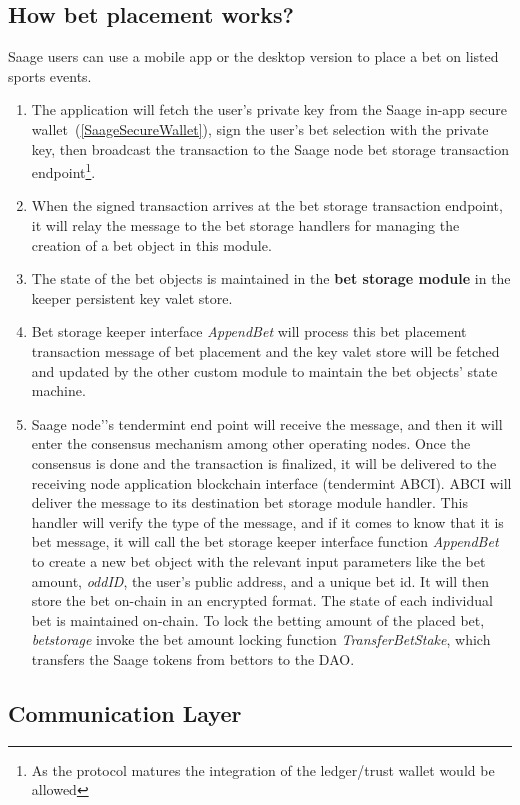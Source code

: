 \documentclass[%
 reprint,
 amsmath,amssymb,
 aps,
]{revtex4-2}
\begin{document}
\subsection{How bet placement works?}
Saage users can use a mobile app or the desktop version to place a bet on listed sports events. 
\begin{enumerate}
\item The application will fetch the user's private key from the Saage in-app secure wallet~(\ref{SaageSecureWallet}), sign the user's bet selection with the private key, then broadcast the transaction to the Saage node bet storage transaction endpoint\footnote{As the protocol matures the integration of the ledger/trust wallet would be allowed}.
\item When the signed transaction arrives at the bet storage transaction endpoint, it will relay the message to the bet storage handlers for managing the creation of a bet object in this module. 
\item The state of the bet objects is maintained in the \textbf{bet storage module} in the keeper persistent key valet store. 
\item Bet storage keeper interface \textit{AppendBet} will process this bet placement transaction message of bet placement and the key valet store will be fetched and updated by the other custom module to maintain the bet objects’ state machine. 
\item Saage node'’s tendermint end point will receive the message, and then it will enter the consensus mechanism among other operating nodes. Once the consensus is done and the transaction is finalized, it will be delivered to the receiving node application blockchain interface (tendermint ABCI). ABCI will deliver the message to its destination bet storage module handler. This handler will verify the type of the message, and if it comes to know that it is bet message, it will call the bet storage keeper interface function \textit{AppendBet} to create a new bet object with the relevant input parameters like the bet amount, \textit{oddID}, the user’s public address, and a unique bet id. It will then store the bet on-chain in an encrypted format. The state of each individual bet is maintained on-chain. To lock the betting amount of the placed bet, \textit{betstorage} invoke the bet amount locking function \textit{TransferBetStake}, which transfers the Saage tokens from bettors to the DAO. 
\end{enumerate}

\subsection{Communication Layer}
%
\end{document}
